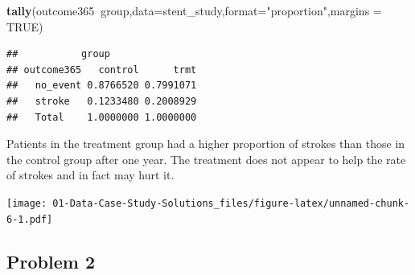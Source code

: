 \documentclass[
]{book}
\newenvironment{Shaded}{\begin{snugshade}}{\end{snugshade}}
\newcommand{\DataTypeTok}[1]{\textcolor[rgb]{0.13,0.29,0.53}{#1}}
\newcommand{\KeywordTok}[1]{\textcolor[rgb]{0.13,0.29,0.53}{\textbf{#1}}}
\newcommand{\NormalTok}[1]{#1}
\newcommand{\OperatorTok}[1]{\textcolor[rgb]{0.81,0.36,0.00}{\textbf{#1}}}
\newcommand{\OtherTok}[1]{\textcolor[rgb]{0.56,0.35,0.01}{#1}}
\newcommand{\StringTok}[1]{\textcolor[rgb]{0.31,0.60,0.02}{#1}}
\begin{document}
\begin{Shaded}
\begin{Highlighting}[]
\KeywordTok{tally}\NormalTok{(outcome365}\OperatorTok{~}\NormalTok{group,}\DataTypeTok{data=}\NormalTok{stent_study,}\DataTypeTok{format=}\StringTok{"proportion"}\NormalTok{,}\DataTypeTok{margins =} \OtherTok{TRUE}\NormalTok{)}
\end{Highlighting}
\end{Shaded}

\begin{verbatim}
##           group
## outcome365   control      trmt
##   no_event 0.8766520 0.7991071
##   stroke   0.1233480 0.2008929
##   Total    1.0000000 1.0000000
\end{verbatim}

Patients in the treatment group had a higher proportion of strokes than those in the control group after one year. The treatment does not appear to help the rate of strokes and in fact may hurt it.

\begin{Shaded}
\end{Shaded}

\texttt{[image: 01-Data-Case-Study-Solutions\_files/figure-latex/unnamed-chunk-6-1.pdf]}

\hypertarget{problem-2}{%
\subsection{Problem 2}\label{problem-2}}
\end{document}
